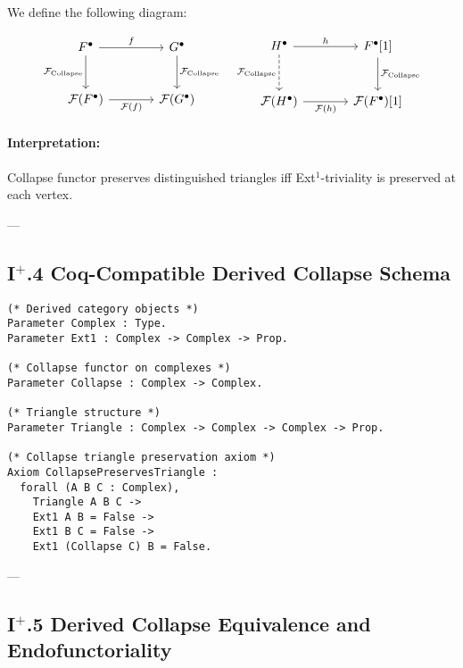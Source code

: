 \documentclass[11pt]{article}
\begin{document}
We define the following diagram:

\[
\begin{tikzcd}[column sep=large, row sep=large]
F^\bullet \arrow[r, "f"] \arrow[d, "\mathcal{F}_{\text{Collapse}}"']
& G^\bullet \arrow[d, "\mathcal{F}_{\text{Collapse}}"] \\
\mathcal{F}(F^\bullet) \arrow[r, "\mathcal{F}(f)"']
& \mathcal{F}(G^\bullet)
\end{tikzcd}
\quad
\begin{tikzcd}[column sep=large, row sep=large]
H^\bullet \arrow[r, "h"] \arrow[d, dashed, "\mathcal{F}_{\text{Collapse}}"']
& F^\bullet[1] \arrow[d, "\mathcal{F}_{\text{Collapse}}"] \\
\mathcal{F}(H^\bullet) \arrow[r, "\mathcal{F}(h)"']
& \mathcal{F}(F^\bullet)[1]
\end{tikzcd}
\]


\paragraph{Interpretation:}  
Collapse functor preserves distinguished triangles iff Ext$^1$-triviality is preserved at each vertex.

---

\subsection*{I$^{+}$.4 Coq-Compatible Derived Collapse Schema}

\begin{lstlisting}[language=Coq]
(* Derived category objects *)
Parameter Complex : Type.
Parameter Ext1 : Complex -> Complex -> Prop.

(* Collapse functor on complexes *)
Parameter Collapse : Complex -> Complex.

(* Triangle structure *)
Parameter Triangle : Complex -> Complex -> Complex -> Prop.

(* Collapse triangle preservation axiom *)
Axiom CollapsePreservesTriangle :
  forall (A B C : Complex),
    Triangle A B C ->
    Ext1 A B = False ->
    Ext1 B C = False ->
    Ext1 (Collapse C) B = False.
\end{lstlisting}

---

\subsection*{I$^{+}$.5 Derived Collapse Equivalence and Endofunctoriality}
\end{document}
